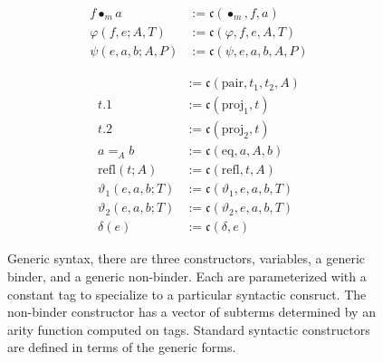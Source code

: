 \begin{figure}
\begin{minipage}{0.5\textwidth}
\begin{align*}
            f \bullet_m a &:= \mathfrak{c}(\bullet_m, f, a) \\
            \varphi(f, e; A, T) &:= \mathfrak{c}(\varphi, f, e, A, T) \\
            \psi(e, a, b; A, P) &:= \mathfrak{c}(\psi, e, a, b, A, P)
        \end{align*}
    \end{minipage}%
    \begin{minipage}{0.5\textwidth}
        \begin{align*}
            [t_1, t_2; A] &:= \mathfrak{c}(\text{pair}, t_1, t_2, A) \\
            t.1 &:= \mathfrak{c}(\text{proj}_1, t) \\
            t.2 &:= \mathfrak{c}(\text{proj}_2, t) \\
            a =_{A} b &:= \mathfrak{c}(\text{eq}, a, A, b) \\
            \text{refl}(t; A) &:= \mathfrak{c}(\text{refl}, t, A) \\
            \vartheta_1(e, a, b; T) &:= \mathfrak{c}(\vartheta_1, e, a, b, T) \\
            \vartheta_2(e, a, b; T) &:= \mathfrak{c}(\vartheta_2, e, a, b, T) \\
            \delta(e) &:= \mathfrak{c}(\delta, e)
        \end{align*}
    \end{minipage}
    \caption{Generic syntax, there are three constructors, variables, a generic binder, and a generic non-binder. Each are parameterized with a constant tag to specialize to a particular syntactic consruct. The non-binder constructor has a vector of subterms determined by an arity function computed on tags. Standard syntactic constructors are defined in terms of the generic forms.}
    \label{fig:syntax}
\end{figure}
